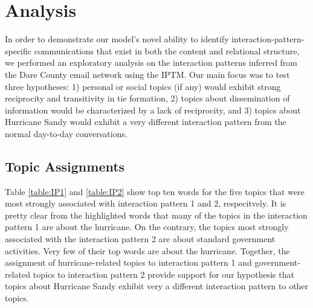 \documentclass[twoside]{article}
\begin{document}
\section{Analysis}\label{sec:Analysis}
In order to demonstrate our model's novel ability to identify interaction-pattern-specific communications that exist in both the content and relational structure, we performed an exploratory analysis on the interaction patterns inferred from the Dare County email network using the IPTM. Our main focus was to test three hypotheses: 1) personal or social topics (if any) would exhibit strong reciprocity and transitivity in tie formation, 2) topics about dissemination of information would be characterized by a lack of reciprocity, and 3) topics about Hurricane Sandy would exhibit a very different
interaction pattern from the normal day-to-day conversations.
\subsection{Topic Assignments}\label{subsec:Topic Assignments}
Table \ref{table:IP1} and \ref{table:IP2} show top ten words for the five topics that were most strongly
associated with interaction pattern 1 and 2, respecitvely. It is pretty clear from the highlighted words that many of the topics in the interaction pattern 1 are about the hurricane. On the contrary, the topics most strongly associated with the interaction pattern 2 are about standard government
activities. Very few of their top words are about the hurricane. Together, the assignment of hurricane-related topics to interaction pattern 1 and government-related topics to interaction pattern 2
provide support for our hypothesis that topics about Hurricane Sandy
exhibit very a different interaction pattern to other topics.
\end{document}
